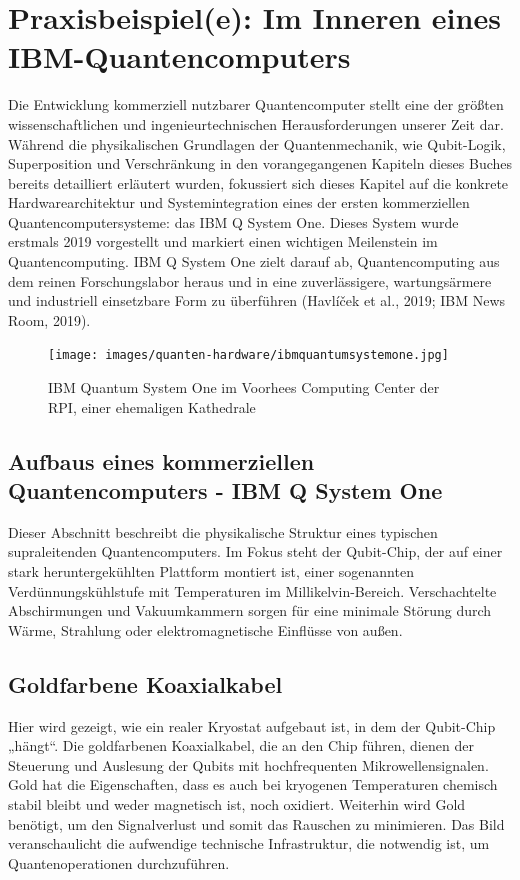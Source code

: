 \section{Praxisbeispiel(e): Im Inneren eines IBM-Quantencomputers}
Die Entwicklung kommerziell nutzbarer Quantencomputer stellt eine der größten wissenschaftlichen und ingenieurtechnischen Herausforderungen unserer Zeit dar. Während die physikalischen Grundlagen der Quantenmechanik, wie Qubit-Logik, Superposition und Verschränkung in den vorangegangenen Kapiteln dieses Buches bereits detailliert erläutert wurden, fokussiert sich dieses Kapitel auf die konkrete Hardwarearchitektur und Systemintegration eines der ersten kommerziellen Quantencomputersysteme: das IBM Q System One. Dieses System wurde erstmals 2019 vorgestellt und markiert einen wichtigen Meilenstein im Quantencomputing. IBM Q System One zielt darauf ab, Quantencomputing aus dem reinen Forschungslabor heraus und in eine zuverlässigere, wartungsärmere und industriell einsetzbare Form zu überführen (Havlíček et al., 2019; IBM News Room, 2019). 

\begin{figure}[H]
    \centering
    \texttt{[image: images/quanten-hardware/ibmquantumsystemone.jpg]}
    \caption{IBM Quantum System One im Voorhees Computing Center der RPI, einer ehemaligen Kathedrale}
    \label{fig:ibmquantumsystemone}
\end{figure}

\subsection{Aufbaus eines kommerziellen Quantencomputers - IBM Q System One}
Dieser Abschnitt beschreibt die physikalische Struktur eines typischen supraleitenden Quantencomputers. Im Fokus steht der Qubit-Chip, der auf einer stark heruntergekühlten Plattform montiert ist, einer sogenannten Verdünnungskühlstufe mit Temperaturen im Millikelvin-Bereich. Verschachtelte Abschirmungen und Vakuumkammern sorgen für eine minimale Störung durch Wärme, Strahlung oder elektromagnetische Einflüsse von außen.


\subsection{Goldfarbene Koaxialkabel}
Hier wird gezeigt, wie ein realer Kryostat aufgebaut ist, in dem der Qubit-Chip „hängt“. Die goldfarbenen Koaxialkabel, die an den Chip führen, dienen der Steuerung und Auslesung der Qubits mit hochfrequenten Mikrowellensignalen. Gold hat die Eigenschaften, dass es auch bei kryogenen Temperaturen chemisch stabil bleibt und weder magnetisch ist, noch oxidiert. Weiterhin wird Gold benötigt, um den Signalverlust und somit das Rauschen zu minimieren. Das Bild veranschaulicht die aufwendige technische Infrastruktur, die notwendig ist, um Quantenoperationen durchzuführen.

